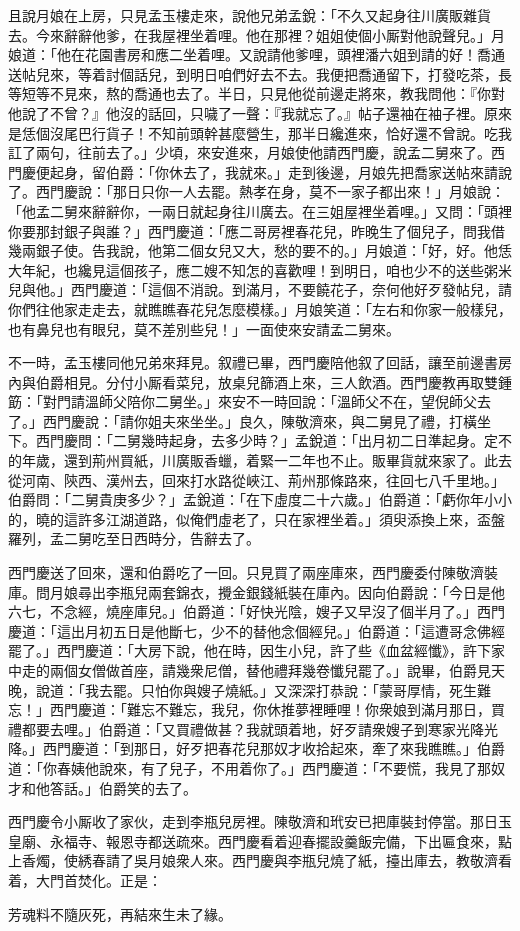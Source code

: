 且說月娘在上房，只見孟玉樓走來，說他兄弟孟銳：「不久又起身往川廣販雜貨去。今來辭辭他爹，在我屋裡坐着哩。他在那裡？姐姐使個小厮對他說聲兒。」月娘道：「他在花園書房和應二坐着哩。又說請他爹哩，頭裡潘六姐到請的好！喬通送帖兒來，等着討個話兒，到明日咱們好去不去。我便把喬通留下，打發吃茶，長等短等不見來，熬的喬通也去了。半日，只見他從前邊走將來，教我問他：『你對他說了不曾？』他沒的話回，只噦了一聲：『我就忘了。』{}帖子還袖在袖子裡。原來是恁個沒尾巴行貨子！不知前頭幹甚麼營生，那半日纔進來，恰好還不曾說。吃我訌了兩句，往前去了。」少頃，來安進來，月娘使他請西門慶，說孟二舅來了。西門慶便起身，留伯爵：「你休去了，我就來。」走到後邊，月娘先把喬家送帖來請說了。西門慶說：「那日只你一人去罷。熱孝在身，莫不一家子都出來！」{}月娘說：「他孟二舅來辭辭你，一兩日就起身往川廣去。在三姐屋裡坐着哩。」又問：「頭裡你要那封銀子與誰？」西門慶道：「應二哥房裡春花兒，昨晚生了個兒子，問我借幾兩銀子使。告我說，他第二個女兒又大，愁的要不的。」月娘道：「好，好。他恁大年紀，也纔見這個孩子，應二嫂不知怎的喜歡哩！{}到明日，咱也少不的送些粥米兒與他。」西門慶道：「這個不消說。到滿月，不要饒花子，奈何他好歹發帖兒，請你們往他家走走去，就瞧瞧春花兒怎麼模樣。」{}月娘笑道：「左右和你家一般樣兒，也有鼻兒也有眼兒，莫不差別些兒！」一面使來安請孟二舅來。

不一時，孟玉樓同他兄弟來拜見。叙禮已畢，西門慶陪他叙了回話，讓至前邊書房內與伯爵相見。分付小厮看菜兒，放桌兒篩酒上來，三人飲酒。西門慶教再取雙鍾筯：「對門請溫師父陪你二舅坐。」來安不一時回說：「溫師父不在，望倪師父去了。」{}西門慶說：「請你姐夫來坐坐。」良久，陳敬濟來，與二舅見了禮，{}打橫坐下。西門慶問：「二舅幾時起身，去多少時？」孟銳道：「出月初二日準起身。定不的年歲，還到荊州買紙，川廣販香蠟，着緊一二年也不止。販畢貨就來家了。此去從河南、陝西、漢州去，回來打水路從峽江、荊州那條路來，往回七八千里地。」伯爵問：「二舅貴庚多少？」孟銳道：「在下虛度二十六歲。」伯爵道：「虧你年小小的，曉的這許多江湖道路，似俺們虛老了，只在家裡坐着。」{}須臾添換上來，盃盤羅列，孟二舅吃至日西時分，告辭去了。

西門慶送了回來，還和伯爵吃了一回。只見買了兩座庫來，西門慶委付陳敬濟裝庫。問月娘尋出李瓶兒兩套錦衣，攪金銀錢紙裝在庫內。因向伯爵說：「今日是他六七，不念經，燒座庫兒。」伯爵道：「好快光陰，嫂子又早沒了個半月了。」西門慶道：「這出月初五日是他斷七，少不的替他念個經兒。」伯爵道：「這遭哥念佛經罷了。」{}西門慶道：「大房下說，他在時，因生小兒，許了些《血盆經懺》，許下家中走的兩個女僧做首座，請幾衆尼僧，替他禮拜幾卷懺兒罷了。」說畢，伯爵見天晚，說道：「我去罷。只怕你與嫂子燒紙。」又深深打恭說：「蒙哥厚情，死生難忘！」西門慶道：「難忘不難忘，我兒，你休推夢裡睡哩！你衆娘到滿月那日，買禮都要去哩。」伯爵道：「又買禮做甚？我就頭着地，好歹請衆嫂子到寒家光降光降。」西門慶道：「到那日，好歹把春花兒那奴才收拾起來，牽了來我瞧瞧。」{}伯爵道：「你春姨他說來，有了兒子，不用着你了。」西門慶道：「不要慌，我見了那奴才和他答話。」伯爵笑的去了。

西門慶令小厮收了家伙，走到李瓶兒房裡。陳敬濟和玳安已把庫裝封停當。那日玉皇廟、永福寺、報恩寺都送疏來。西門慶看着迎春擺設羹飯完備，下出匾食來，點上香燭，使綉春請了吳月娘衆人來。西門慶與李瓶兒燒了紙，擡出庫去，教敬濟看着，大門首焚化。正是：

\begin{myquote} 
芳魂料不隨灰死，再結來生未了緣。
\end{myquote} 

